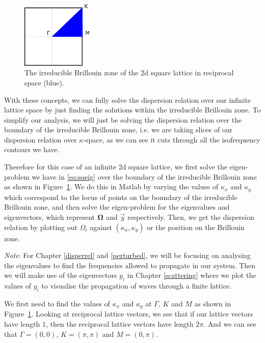 \begin{figure}[!h]
\centering
\includegraphics[width=0.3\textwidth]{imgs/sqibz.png}
\caption{\label{fig:ibzonesq} The irreducible Brillouin zone of the 2d square
    lattice in reciprocal space (blue).}
\end{figure}

With these concepts, we can fully solve the dispersion relation over our
infinite lattice space by just finding the solutions within the irreducible
Brillouin zone. To simplify our analysis, we will just be solving the
dispersion relation over the boundary of the irreducible Brillouin zone, i.e.
we are taking slices of our dispersion relation over $\kappa$-space, as we can
see it cuts through all the isofrequency contours we have.

Therefore for this case of an infinite 2d square lattice, we first solve the
eigen-problem we have in \eqref{eq:sqeig} over the boundary of the irreducible
Brillouin zone as shown in Figure~\ref{fig:ibzonesq}. We do this in Matlab by
varying the values of $\kappa_{x}$ and $\kappa_{y}$ which correspond to the
locus of points on the boundary of the irreducible Brillouin zone, and then
solve the eigen-problem for the eigenvalues and eigenvectors, which represent
$\mathbf{\Omega}$ and $\vec{y}$ respectively. Then, we get the dispersion relation
by plotting out $\Omega_i$ against $(\kappa_x,\kappa_y)$ or the position on the
Brillouin zone.

\textit{Note}: For Chapter \ref{disperrel} and \ref{perturbed}, we will be
focusing on analysing the eigenvalues to find the frequencies allowed to
propagate in our system. Then we will make use of the eigenvectors $y_i$ in
Chapter \ref{scattering} where we plot the values of $y_i$ to visualise the
propagation of waves through a finite lattice.

We first need to find the values of $\kappa_{x}$ and $\kappa_{y}$ at $\Gamma$,
$K$ and $M$ as shown in Figure~\ref{fig:ibzonesq}. Looking at reciprocal
lattice vectors, we see that if our lattice vectors have length $1$, then the
reciprocal lattice vectors have length $2\pi$. And we can see that $\Gamma =
(0,0)$, $K=(\pi,\pi)$ and $M=(0,\pi)$.

